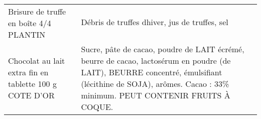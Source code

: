 \begin{longtable}{p{5cm}p{10cm}}
                                                                   Brisure de truffe en boîte 4/4 PLANTIN &                                                                                                                                                                                                                                                                                                                                                                                                                                                                                                                                                                                                                                                                                                                                                                                                                                                                                                                                                                                           Débris de truffes dhiver, jus de truffes, sel \\
                                                   Chocolat au lait extra fin en tablette 100 g COTE D'OR &                                                                                                                                                                                                                                                                                                                                                                                                                                                                                                                                                                                                                                                                                                                                                                                                                              Sucre, pâte de cacao, poudre de LAIT écrémé, beurre de cacao, lactosérum en poudre (de LAIT), BEURRE concentré, émulsifiant (lécithine de SOJA), arômes. Cacao : 33\% minimum. PEUT CONTENIR FRUITS À COQUE. \\

\end{longtable}
